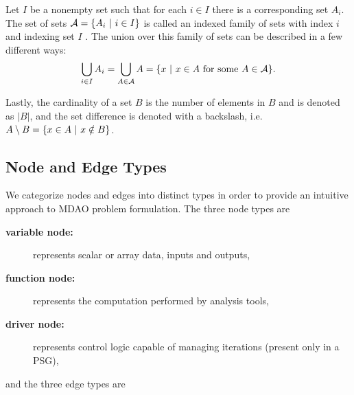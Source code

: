   Let $I$ be a nonempty set such that for each $i \in I$ there is a corresponding set $A_i$. 
  The set of sets $\mathcal A = \{A_i \ | \  i \in I\}$ is called an indexed family of sets with index $i$ and 
  indexing set $I$ \cite{smith2006}. 
  The union over this family of sets can be described in a few different ways:
  \begin{equation}
  \bigcup_{i \in I} A_i = \bigcup_{A \in \mathcal A} A = \{x \ | \  x \in A \textrm{ for some } A \in \mathcal A\}.
  \end{equation}

  Lastly, the cardinality of a set $B$ is the number of elements in $B$ and is denoted as $|B|$, and the set difference is denoted with a backslash, i.e. $A \setminus B = \{x \in A \ | \  x \notin B\}$.

\subsection{Node and Edge Types}
  \label{ss:types}
We categorize nodes and edges 
  into distinct types in order to provide an intuitive approach to MDAO problem formulation. 
  The three node types are
    \begin{description}
      \item[\bf{variable node:}] represents scalar or array data, inputs and outputs,
      \item[\bf{function node:}] represents the computation performed by analysis tools,
      \item[\bf{driver node:}] represents control logic capable of managing iterations 
      (present only in a PSG),
    \end{description}
  and the three edge types are

